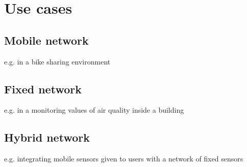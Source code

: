 	\section{Use cases}
		
		\subsection{Mobile network}
		
			e.g. in a bike sharing environment
		
		\subsection{Fixed network}
		
			e.g. in a monitoring values of air quality inside a building
		
		\subsection{Hybrid network}
		
			e.g. integrating mobile sensors given to users with a network of fixed sensors